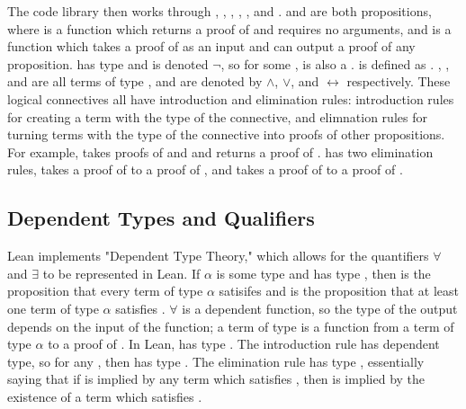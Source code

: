 The code library then works through , , , 
, , and .
 and  are both propositions, where  is a function which
returns a proof of  and requires no arguments, and  is a function
which takes a proof of  as an input and can output a proof of any
proposition.  has type  and is denoted $\lnot$, so for
some ,  is also a .  is defined as
. , , and  are all terms of type 
, and are denoted by 
$\wedge$, $\vee$, and $\leftrightarrow$ respectively. These logical connectives
all have introduction and elimination rules: introduction rules for
creating a term with the type of the connective, and elimnation rules for
turning terms with the type of the connective into proofs of other propositions.
For example,  takes proofs of  and  and returns a proof of
.  has two elimination rules,  takes a proof
of  to a proof of , and  takes a proof of 
 to a proof of . 

\subsection{Dependent Types and Qualifiers}

Lean implements "Dependent Type Theory," which allows for the quantifiers
$\forall$ and $\exists$ to be represented in Lean. If $\alpha$ is some
type and  has type , then 
 is the proposition that every term of type $\alpha$
satisifes  and  is the proposition that
at least one term of type $\alpha$ satisfies . $\forall$ is a dependent
function, so the type of the output depends on the input of the function; 
a term of type  is a function from
a term  of type $\alpha$ to a proof of . In Lean,
 has type . The introduction
rule  has dependent type, so for any ,
then  has type . The elimination
rule  has type 
, essentially
saying that if  is implied by any term which satisfies , then 
 is implied by the existence of a term which satisfies .

